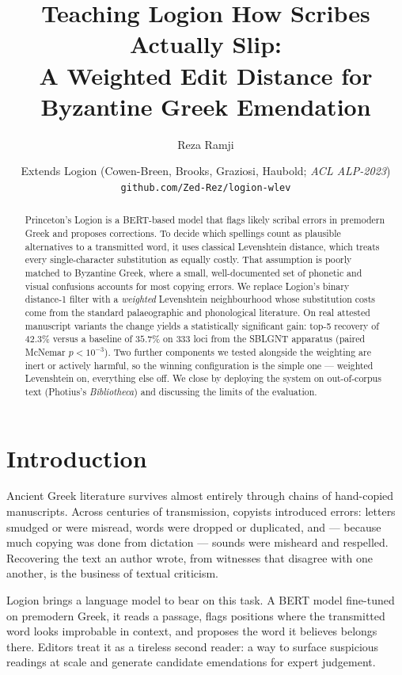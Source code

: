 \documentclass[11pt]{article}
\title{\vspace{-2.5em}Teaching Logion How Scribes Actually Slip:\\[0.3em]
\large A Weighted Edit Distance for Byzantine Greek Emendation}
\author{Reza Ramji}
\date{Extends Logion (Cowen-Breen, Brooks, Graziosi, Haubold; \emph{ACL ALP-2023})\\[0.2em]
\small\texttt{github.com/Zed-Rez/logion-wlev}}
\begin{document}
\maketitle

\begin{abstract}
\noindent Princeton's Logion is a BERT-based model that flags likely scribal errors in
premodern Greek and proposes corrections. To decide which spellings count as
plausible alternatives to a transmitted word, it uses classical Levenshtein
distance, which treats every single-character substitution as equally costly.
That assumption is poorly matched to Byzantine Greek, where a small, well-documented
set of phonetic and visual confusions accounts for most copying errors.
We replace Logion's binary distance-1 filter with a \emph{weighted} Levenshtein
neighbourhood whose substitution costs come from the standard palaeographic
and phonological literature. On real attested manuscript variants the change yields
a statistically significant gain: top-5 recovery of $42.3\%$ versus a baseline of
$35.7\%$ on $333$ loci from the SBLGNT apparatus (paired McNemar $p<10^{-3}$).
Two further components we tested alongside the weighting are inert or actively
harmful, so the winning configuration is the simple one --- weighted Levenshtein
on, everything else off. We close by deploying the system on out-of-corpus text
(Photius's \emph{Bibliotheca}) and discussing the limits of the evaluation.
\end{abstract}

\section{Introduction}

Ancient Greek literature survives almost entirely through chains of hand-copied
manuscripts. Across centuries of transmission, copyists introduced errors:
letters smudged or were misread, words were dropped or duplicated, and --- because
much copying was done from dictation --- sounds were misheard and respelled.
Recovering the text an author wrote, from witnesses that disagree with one
another, is the business of textual criticism.

Logion \cite{logion2023} brings a language model to bear on this task. A
BERT model fine-tuned on premodern Greek, it reads a passage, flags positions
where the transmitted word looks improbable in context, and proposes the word it
believes belongs there. Editors treat it as a tireless second reader: a way to
surface suspicious readings at scale and generate candidate emendations for
expert judgement.
\end{document}
